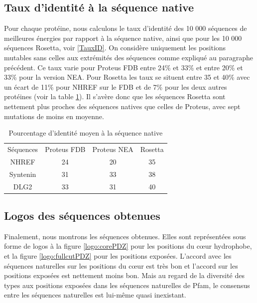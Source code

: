   
\subsection{Taux d'identité à la séquence native}  
  
Pour chaque protéine, nous calculons le taux d'identité des 10 000 séquences de meilleures énergies par rapport à la séquence native, ainsi que pour les 10 000 séquences Rosetta, voir \ref{TauxID}. On considère uniquement les positions mutables sans celles aux extrémités des séquences comme expliqué au paragraphe précédent. Ce taux varie pour Proteus FDB entre 24\% et 33\% et entre 20\% et 33\% pour la version NEA. Pour Rosetta les taux se situent entre 35 et 40\% avec un écart de 11\% pour NHREF sur le FDB et de 7\% pour les deux autres protéines (voir la table \ref{tab:IdentNEA}). Il s'avère donc que les séquences Rosetta sont nettement plus proches des séquences natives que celles de Proteus, avec sept mutations de moins en moyenne.  

\begin{table}[!htbp]
      \centering

      \begin{tabular}{cccc}

        \toprule
        Séquences & Proteus FDB & Proteus NEA & Rosetta \\
        \cmidrule{1-4}
        NHREF     & 24 & 20 & 35 \\
        Syntenin  & 31 & 33 & 38 \\
        DLG2      & 33 & 31 & 40 \\
        \bottomrule

      \end{tabular}      
      \caption{Pourcentage d'identité moyen à la séquence native}
\label{tab:IdentNEA}      
    \end{table}

\subsection{Logos des séquences obtenues}
Finalement, nous montrons les séquences obtenues. Elles sont représentées sous forme de logos à la figure \ref{logo:corePDZ} pour les positions du cœur hydrophobe, et la figure \ref{logo:fullcutPDZ} pour les positions exposées. L'accord avec les séquences naturelles sur les positions du cœur est très bon et l'accord sur les positions exposées est nettement moins bon. Mais au regard de la diversité des types aux positions exposées dans les séquences naturelles de Pfam, le consensus entre les séquences naturelles est lui-même quasi inexistant.

